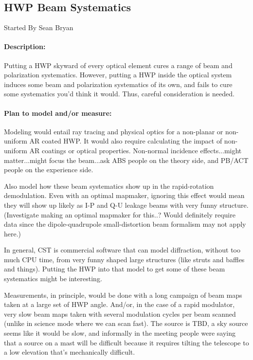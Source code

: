 
\subsection{HWP Beam Systematics}

Started By Sean Bryan

\paragraph{Description:}
Putting a HWP skyward of every optical element cures a range of beam and polarization systematics. However, putting a HWP inside the optical system induces some beam and polarization systematics of its own, and fails to cure some systematics you'd think it would. Thus, careful consideration is needed.

\paragraph{Plan to model and/or measure:}
Modeling would entail ray tracing and physical optics for a non-planar or non-uniform AR coated HWP. It would also require calculating the impact of non-uniform AR coatings or optical properties. Non-normal incidence effects...might matter...might focus the beam...ask ABS people on the theory side, and PB/ACT people on the experience side.

Also model how these beam systematics show up in the rapid-rotation demodulation. Even with an optimal mapmaker, ignoring this effect would mean they will show up likely as I-P and Q-U leakage beams with very funny structure. (Investigate making an optimal mapmaker for this..? Would definitely require data since the dipole-quadrupole small-distortion beam formalism may not apply here.)

In general, CST is commercial software that can model diffraction, without too much CPU time, from very funny shaped large structures (like struts and baffles and things). Putting the HWP into that model to get some of these beam systematics might be interesting.

Measurements, in principle, would be done with a long campaign of beam maps taken at a large set of HWP angle. And/or, in the case of a rapid modulator, very slow beam maps taken with several modulation cycles per beam scanned (unlike in science mode where we can scan fast). The source is TBD, a sky source seems like it would be slow, and informally in the meeting people were saying that a source on a mast will be difficult because it requires tilting the telescope to a low elevation that's mechanically difficult.

